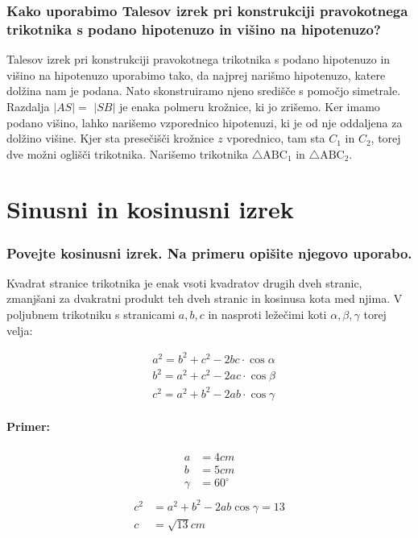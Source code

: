 \documentclass{article}
\begin{document}
\subsubsection*{Kako uporabimo Talesov izrek pri konstrukciji pravokotnega trikotnika s podano hipotenuzo in višino na hipotenuzo?}

Talesov izrek pri konstrukciji pravokotnega trikotnika s podano hipotenuzo in višino na hipotenuzo uporabimo tako, da najprej narišmo hipotenuzo, katere dolžina nam je podana. Nato skonstruiramo njeno središče s pomočjo simetrale. Razdalja $|A S|=$ $|S B|$ je enaka polmeru krožnice, ki jo zrišemo. Ker imamo podano višino, lahko narišemo vzporednico hipotenuzi, ki je od nje oddaljena za dolžino višine. Kjer sta presečišči krožnice $z$ vporednico, tam sta $C_{1}$ in $C_{2}$, torej dve možni oglišči trikotnika. Narišemo trikotnika $\triangle \mathrm{ABC}_{1}$ in $\triangle \mathrm{ABC}_{2}$.

\section{Sinusni in kosinusni izrek}
\subsubsection*{Povejte kosinusni izrek. Na primeru opišite njegovo uporabo.}

Kvadrat stranice trikotnika je enak vsoti kvadratov drugih dveh stranic, zmanjšani za dvakratni produkt teh dveh stranic in kosinusa kota med njima. V poljubnem trikotniku s stranicami $a, b, c$ in nasproti ležečimi koti $\alpha, \beta, \gamma$ torej velja:

$$
\begin{aligned}
& a^{2}=b^{2}+c^{2}-2 b c \cdot \cos \alpha \\
& b^{2}=a^{2}+c^{2}-2 a c \cdot \cos \beta \\
& c^{2}=a^{2}+b^{2}-2 a b \cdot \cos \gamma
\end{aligned}
$$

\paragraph{Primer:}

\begin{multicols}{2}
\begin{align*}
    a &= 4 cm \\
    b &= 5 cm \\
    \gamma &= 60^\circ
\end{align*} \columnbreak
\begin{align*}
    \\
    c^2 &= a^2 + b^2 - 2ab\cos \gamma = 13 \\
    c &= \sqrt{13} cm
\end{align*}
\end{multicols}
\end{document}

